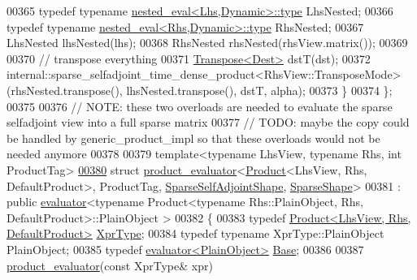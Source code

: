 \begin{DoxyCode}
00365     \textcolor{keyword}{typedef} \textcolor{keyword}{typename} \hyperlink{class_eigen_1_1internal_1_1_tensor_lazy_evaluator_writable}{nested\_eval<Lhs,Dynamic>::type} LhsNested;
00366     \textcolor{keyword}{typedef} \textcolor{keyword}{typename} \hyperlink{class_eigen_1_1internal_1_1_tensor_lazy_evaluator_writable}{nested\_eval<Rhs,Dynamic>::type} RhsNested;
00367     LhsNested lhsNested(lhs);
00368     RhsNested rhsNested(rhsView.matrix());
00369     
00370     \textcolor{comment}{// transpose everything}
00371     \hyperlink{group___core___module_class_eigen_1_1_transpose}{Transpose<Dest>} dstT(dst);
00372     internal::sparse\_selfadjoint\_time\_dense\_product<RhsView::TransposeMode>(rhsNested.transpose(), 
      lhsNested.transpose(), dstT, alpha);
00373   \}
00374 \};
00375 
00376 \textcolor{comment}{// NOTE: these two overloads are needed to evaluate the sparse selfadjoint view into a full sparse matrix}
00377 \textcolor{comment}{// TODO: maybe the copy could be handled by generic\_product\_impl so that these overloads would not be
       needed anymore}
00378 
00379 \textcolor{keyword}{template}<\textcolor{keyword}{typename} LhsView, \textcolor{keyword}{typename} Rhs, \textcolor{keywordtype}{int} ProductTag>
\hyperlink{struct_eigen_1_1internal_1_1product__evaluator_3_01_product_3_01_lhs_view_00_01_rhs_00_01_defaul9695c5493cd4054bc6e3c91568225f16}{00380} \textcolor{keyword}{struct }\hyperlink{struct_eigen_1_1internal_1_1product__evaluator}{product\_evaluator}<\hyperlink{group___core___module_class_eigen_1_1_product}{Product}<LhsView, Rhs, DefaultProduct>, ProductTag, 
      \hyperlink{struct_eigen_1_1internal_1_1_sparse_self_adjoint_shape}{SparseSelfAdjointShape}, \hyperlink{struct_eigen_1_1_sparse_shape}{SparseShape}>
00381   : \textcolor{keyword}{public} \hyperlink{struct_eigen_1_1internal_1_1evaluator}{evaluator}<typename Product<typename Rhs::PlainObject, Rhs, DefaultProduct>::PlainObject
      >
00382 \{
00383   \textcolor{keyword}{typedef} \hyperlink{group___core___module_class_eigen_1_1_product}{Product<LhsView, Rhs, DefaultProduct>} 
      \hyperlink{group___core___module_class_eigen_1_1_product}{XprType};
00384   \textcolor{keyword}{typedef} \textcolor{keyword}{typename} XprType::PlainObject PlainObject;
00385   \textcolor{keyword}{typedef} \hyperlink{struct_eigen_1_1internal_1_1evaluator}{evaluator<PlainObject>} \hyperlink{struct_eigen_1_1internal_1_1evaluator}{Base};
00386 
00387   \hyperlink{struct_eigen_1_1internal_1_1product__evaluator}{product\_evaluator}(\textcolor{keyword}{const} XprType& xpr)

\end{DoxyCode}
